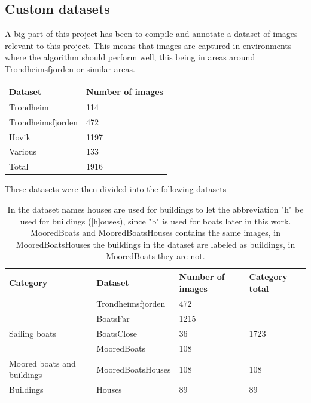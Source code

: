 \subsection{Custom datasets}
\label{sec:cust_dataset}
A big part of this project has been to compile and annotate a dataset of images relevant to this project. This means that images are captured in environments where the algorithm should perform well, this being in areas around Trondheimsfjorden or similar areas.


\begin{table}[h!]
\centering
\begin{tabular}{l|l}
Dataset           & Number of images \\ \hline
Trondheim         & 114              \\
Trondheimsfjorden & 472              \\
Hovik             & 1197             \\
Various           & 133              \\ \hline
Total             & 1916            
\end{tabular}
\end{table}

\newpage

These datasets were then divided into the following datasets

\begin{table}[h!]
\centering
\begin{tabular}{l|l|l|l}
Category                   & Dataset           & Number of images & Category total \\ \hline
                           & Trondheimsfjorden & 472              &                \\
                           & BoatsFar        & 1215             &                \\
Sailing boats              & BoatsClose      & 36               & 1723           \\ \hline
 & MooredBoats  & 108              &             \\
Moored boats and buildings & MooredBoatsHouses  & 108              & 108            \\ \hline
Buildings                  & Houses         & 89               & 89            
\end{tabular}
\caption{In the dataset names houses are used for buildings to let the abbreviation "h" be used for buildings ([h]ouses), since "b" is used for boats later in this work. MooredBoats and MooredBoatsHouses contains the same images, in MooredBoatsHouses the buildings in the dataset are labeled as buildings, in MooredBoats they are not.}
\end{table}

